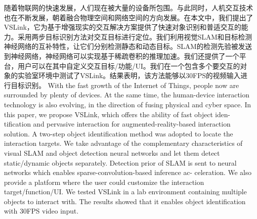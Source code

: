 \cleardoublepage
{}
随着物联网的快速发展，人们现在被大量的设备所包围。与此同时，人机交互技术也在不断发展，朝着融合物理空间和网络空间的方向发展。在本文中，我们提出了VSLink，它为基于增强现实的交互解决方案提供了快速对象识别和普适交互的能力。采用两步目标识别方法对交互目标进行定位。我们利用视觉SLAM和目标检测神经网络的互补特性，让它们分别检测静态和动态目标。SLAM的检测先验被发送到神经网络，神经网络可以实现基于稀疏卷积的推理加速。我们还提供了一个平台，用户可以在其中自定义交互目标/功能/UI。我们在一个包含多个要交互的对象的实验室环境中测试了VSLink。结果表明，该方法能够以30FPS的视频输入进行目标识别。
\cleardoublepage
{}
With the fast growth of the Internet of Things, people now are surrounded by plenty of devices. At the same time, the human-device interaction technology is also evolving, in the direction of fusing physical and cyber space. In this paper, we propose VSLink, which offers the ability of fast object iden- tification and pervasive interaction for augmented-reality-based interaction solution. A two-step object identification method was adopted to locate the interaction targets. We take advantage of the complementary characteristics of visual SLAM and object detection neural networks and let them detect static/dynamic objects separately. Detection prior of SLAM is sent to neural networks which enables sparse-convolution-based inference ac- celeration. We also provide a platform where the user could customize the interaction target/function/UI. We tested VSLink in a lab environment containing multiple objects to interact with. The results showed that it enables object identification with 30FPS video input.